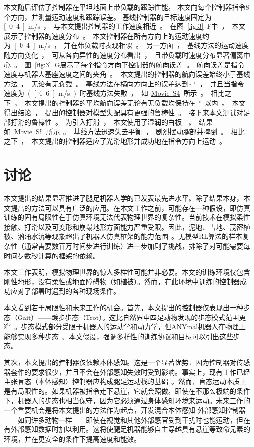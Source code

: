 \documentclass[9pt,twocolumn,twoside]{osajnl}
\begin{document}
本文随后评估了控制器在平坦地面上带负载的跟踪性能。
本文向每个控制器指令8个方向，并测量运动速度和跟踪误差。
基线控制器的目标速度固定为\unit[0.4]{m/s}，与本文提出控制器的工作速度相近。
在图~\ref{fig:3}F中，本文展示了控制器的速度分布。本文控制器在所有方向上的运动速度约为\unit[0.4]{m/s}，并在带负载时表现相似。
另一方面，基线方法的运动速度随方向变化，可从各向异性的速度分布看出，且带负载时速度分布显著偏离中心。
图~\ref{fig:3}G展示了每个指令方向下控制器的航向误差。航向误差是指令速度与机器人基座速度之间的夹角。本文提出的控制器的航向误差始终小于基线方法，无论有无负载。
基线方法在横向方向上的误差达到$\sim$\unit[30]{$^\circ$}，并且当指令速度为(\unit[0.6]{m/s})时基线方法失败，如\href{https://youtu.be/3Nr47MXCFO0}{Movie~S4}所示。
相比之下，本文提出的控制器的平均航向误差无论有无负载均保持在\unit[10]{$^\circ$}以内。本文得出结论，提出的控制器对模型失配具有更强的鲁棒性。

接下来本文测试对足部打滑的鲁棒性。
为引入打滑，本文使用了湿润的白板~\cite{jenelten2019dynamic}。
结果如\href{https://youtu.be/aMPwB3t4idU}{Movie~S5}所示。
基线方法迅速失去平衡，剧烈摆动腿部并摔倒。相比之下，本文提出的控制器适应了光滑地形并成功地在指令方向上运动。

\section{讨论}
本文提出的结果显著推进了腿足机器人学的已发表最先进水平。除了结果本身，本文提出的方法可以具有广泛的应用。在本文工作之前，可能存在一种假设，即仿真训练的固有局限性在于仿真环境无法代表物理世界的复杂性。当前技术在模拟柔性接触、打滑以及可变形和崩塌地形方面能力严重受限。因此，泥地、雪地、茂密植被、汹涌水流等现象超出了机器人仿真框架的能力范围~\cite{hwangbo2018per,coumans2013bullet,smith2005open}。无模型RL算法的样本复杂性（通常需要数百万时间步进行训练）进一步加剧了挑战，排除了对可能需要每时间步数秒计算的框架的依赖。

本文工作表明，模拟物理世界的惊人多样性可能并非必要。本文的训练环境仅包含刚性地形，没有柔性或地面障碍物（如植被）。然而，在此环境中训练的控制器成功应对了部署时遇到的各种现场条件。

本文看到若干局限性和未来工作的机会。首先，本文提出的控制器仅表现出一种步态（Gait）——踱步步态（Trot）。这比自然界中四足动物发现的步态模式范围更窄~\cite{Alexander2003}。步态模式部分受限于机器人的运动学和动力学，但ANYmal机器人在物理上能够实现多种步态~\cite{bellicoso2018dynamic}。本文假设，强调多样性的训练协议和目标可以引出这些步态。

其次，本文提出的控制器仅依赖本体感知。这是一个显著优势，因为控制器对传感器套件的要求很少，并且不会在外部感知失效时受到影响。事实上，现有工作已经主张盲态（本体感知）控制器应构成腿足运动栈的基础~\cite{focchi2020heuristic}。然而，盲态运动本质上是有局限性的。如果机器被指令走下悬崖，它就会照做。即使在不那么极端的条件下，机器人的步态也相当保守，因为它必须通过身体感知环境来运动。未来工作的一个重要机会是将本文提出的方法作为起点，开发混合本体感知-外部感知控制器——如同许多动物一样——即使在视觉和其他外部感官受到干扰时也能运动，但在有外部感知数据时加以利用。这将使腿足机器能够自主穿越具有悬崖等致命元素的环境，并在更安全的条件下提高速度和能效。
\end{document}
